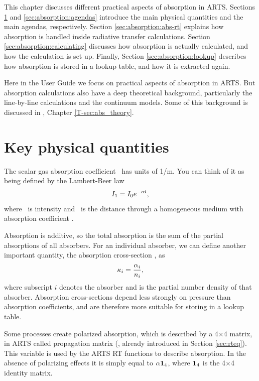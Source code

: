 This chapter discusses different practical aspects of absorption in
ARTS. Sections \ref{sec:absorption:quantities} and
\ref{sec:absorption:agendas} introduce the main physical quantities
and the main agendas, respectively. Section
\ref{sec:absorption:abs-rt} explains how absorption is handled inside
radiative transfer calculations.  Section
\ref{sec:absorption:calculating} discusses how absorption is actually
calculated, and how the calculation is set up.  Finally, Section
\ref{sec:absorption:lookup} describes how absorption is stored in a
lookup table, and how it is extracted again.

Here in the User Guide we focus on practical aspects of absorption in
ARTS. But absorption calculations also have a deep theoretical
background, particularly the line-by-line calculations and the
continuum models.  Some of this background is discussed in \theory,
Chapter \ref{T-sec:abs_theory}. 


\section{Key physical quantities}
\label{sec:absorption:quantities}

The scalar gas absorption coefficient \AbsCoef\ has units of 1/m.  You
can think of it as being defined by the Lambert-Beer law
\begin{equation}
  I_1 = I_0 e^{-{\alpha} l},  
\end{equation}
where \Mpi\ is intensity and \PpathLng\ is the distance through a
homogeneous medium with absorption coefficient \AbsCoef.  

Absorption is additive, so the total absorption is the sum of the
partial absorptions of all absorbers.  For an individual absorber, we
can define another important quantity, the absorption cross-section
, as
\begin{equation}
  {\kappa}_{i} = \frac{{\alpha}_{i}}{{n}_{i}},
\end{equation}
where subscript $i$ denotes the absorber and  is the partial
number density of that absorber.  Absorption cross-sections depend
less strongly on pressure than absorption coefficients, and are
therefore more suitable for storing in a lookup table.

Some processes create polarized absorption, which is described by a
4$\times$4 matrix, in ARTS called propagation matrix
(, already introduced in Section \ref{sec:rteq}).
This variable is used by the ARTS RT
functions to describe absorption.  In the absence of polarizing
effects it is simply equal to ${\alpha} \mathbf{1}_4$, where $\mathbf{1}_4$
is the 4$\times$4 identity matrix. 

